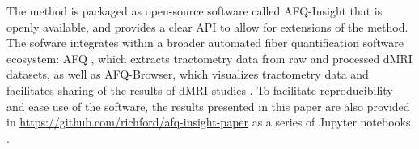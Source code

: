 The method is packaged as open-source software called AFQ-Insight
that is openly available, and provides a clear API to allow
for extensions of the method. The sofware integrates within a
broader automated fiber quantification software ecosystem: AFQ
\cite{yeatman2012tract}, which extracts tractometry data from raw and
processed dMRI datasets, as well as AFQ-Browser, which visualizes
tractometry data and facilitates sharing of the results of dMRI studies
\cite{yeatman2018browser}. To facilitate reproducibility and ease use
of the software, the results presented in this paper are also provided
in \url{https://github.com/richford/afq-insight-paper} as a series of
Jupyter notebooks \cite{kluyver2016jupyter}.

